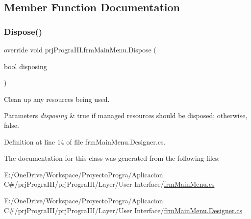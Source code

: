 \subsection{Member Function Documentation}
\hypertarget{classprj_progra_i_i_i_1_1frm_main_menu_a912500ba32f7af8f2f097061ebad8b75}{}\label{classprj_progra_i_i_i_1_1frm_main_menu_a912500ba32f7af8f2f097061ebad8b75} 
\subsubsection{\texorpdfstring{Dispose()}{Dispose()}}
{\footnotesize\ttfamily override void prj\+Progra\+I\+I\+I.\+frm\+Main\+Menu.\+Dispose (\begin{DoxyParamCaption}\item[{bool}]{disposing }\end{DoxyParamCaption})\hspace{0.3cm}{\ttfamily [protected]}}



Clean up any resources being used. 


\begin{DoxyParams}{Parameters}
{\em disposing} & true if managed resources should be disposed; otherwise, false.\\
\hline
\end{DoxyParams}


Definition at line 14 of file frm\+Main\+Menu.\+Designer.\+cs.



The documentation for this class was generated from the following files\+:\begin{DoxyCompactItemize}
\item 
E\+:/\+One\+Drive/\+Workspace/\+Proyecto\+Progra/\+Aplicacion C\#/prj\+Progra\+I\+I\+I/prj\+Progra\+I\+I\+I/\+Layer/\+User Interface/\hyperlink{frm_main_menu_8cs}{frm\+Main\+Menu.\+cs}\item 
E\+:/\+One\+Drive/\+Workspace/\+Proyecto\+Progra/\+Aplicacion C\#/prj\+Progra\+I\+I\+I/prj\+Progra\+I\+I\+I/\+Layer/\+User Interface/\hyperlink{frm_main_menu_8_designer_8cs}{frm\+Main\+Menu.\+Designer.\+cs}\end{DoxyCompactItemize}
